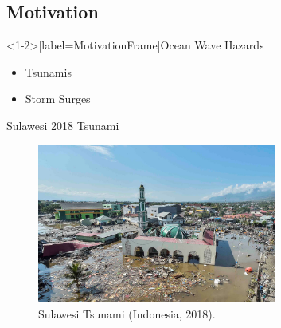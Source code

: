 \documentclass[pdf]{beamer}
\begin{document}
\subsection{Motivation}
\begin{frame}<1-2>[label=MotivationFrame]{Ocean Wave Hazards}
	\pause
	\begin{itemize}
		\item Tsunamis
		\pause
		\item Storm Surges
	\end{itemize}
\end{frame}
\begin{frame}{Sulawesi 2018 Tsunami}
	\begin{figure}
		\includegraphics[width=0.7\textwidth]{./Pics/Web/SualwesiTsunami.jpg}
		\caption{Sulawesi Tsunami (Indonesia, 2018).}
	\end{figure}
\end{frame}
\end{document}
